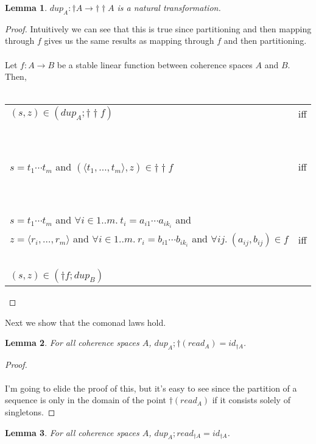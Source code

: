 \documentclass{article}
\newtheorem{lemma}{Lemma}
\begin{document}
\begin{lemma}
$\mathit{dup}_A : \dagger A \to \dagger \dagger A$ is a natural transformation. 
\end{lemma}

\begin{proof}
Intuitively we can see that this is true since partitioning and then mapping through $f$ gives us the same results as mapping through $f$ and then partitioning.\\~\\

Let $f : A \to B$ be a stable linear function between coherence spaces $A$ and $B$. Then,\\~\\
\begin{tabular}{ll}
$(s,z) \in (\mathit{dup}_A; \dagger \dagger f)$ & iff \\~\\
 ~ & ~ \\
$s = t_1 \cdots t_m$ and $(\langle t_1, \ldots, t_m \rangle,z) \in \dagger \dagger f$ & iff \\~\\
 ~ & ~ \\
$s = t_1 \cdots t_m$ and $\forall i \in 1..m.~t_i = a_{i1} \cdots a_{i k_i}$ and \\ 
$z = \langle r_i, \ldots, r_m \rangle$ and $\forall i \in 1..m.~r_i = b_{i1} \cdots b_{i k_i}$ and $\forall i j.~(a_{ij}, b_{ij}) \in f$ & iff \\~\\
$(s,z) \in (\dagger f; \mathit{dup}_{B})$
\end{tabular}

\end{proof}

Next we show that the comonad laws hold.

\begin{lemma}
For all coherence spaces $A$, $\mathit{dup}_A;\dagger(\mathit{read}_A) = \mathit{id}_{\dagger A}$.
\end{lemma}

\begin{proof}~\\~\\
I'm going to elide the proof of this, but it's easy to see since the partition of a sequence is only in the domain of the point $\dagger (read_A)$ if it consists solely of singletons.
\end{proof}

\begin{lemma}
For all coherence spaces $A$, $\mathit{dup}_A;\mathit{read}_{\dagger A} = \mathit{id}_{\dagger A}$.
\end{lemma}
\end{document}
